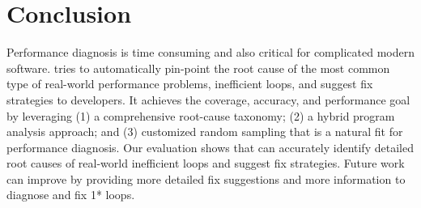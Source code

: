 \section{Conclusion}
\label{sec:con}
Performance diagnosis is time consuming and also critical for 
complicated modern software. \Tool tries to automatically 
pin-point the root cause of
the most common type of real-world performance problems, inefficient loops,
and suggest fix strategies to developers. It achieves the 
coverage, accuracy, and performance goal by leveraging
(1) a comprehensive root-cause taxonomy; (2) a hybrid program
analysis approach; and (3) customized random sampling that is a natural fit for 
performance diagnosis.
Our evaluation shows that \Tool can accurately identify detailed root causes
of real-world inefficient loops and suggest fix strategies.
Future work can improve \Tool by providing more detailed fix
suggestions and more information to diagnose and fix
1* loops.


